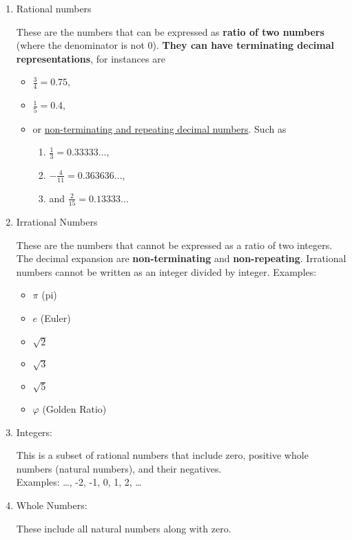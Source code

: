\documentclass{article}
\begin{document}
\begin{enumerate}

    \item Rational numbers \par 
    These are the numbers that can be expressed as
    \textbf{ratio of two numbers} (where the denominator is not 0).
    \textbf{They can have terminating decimal representations},
    for instances are
    \begin{itemize}
        \item $\frac{3}{4} = 0.75$,
        \item $\frac{1}{5} = 0.4$,
        \item or \underline{non-terminating and repeating decimal numbers}.
        Such as
        \begin{enumerate}
            \item $\frac{1}{3} = 0.33333\dots$,
            \item $- \frac{4}{11} = 0.363636\dots$,
            \item and $\frac{2}{15} = 0.13333\dots$
        \end{enumerate}
    \end{itemize}

    \item Irrational Numbers \par
    These are the numbers that cannot be expressed as a ratio of two integers.
    The decimal expansion are \textbf{non-terminating} and \textbf{non-repeating}.
    Irrational numbers cannot be written as an integer divided by integer.
    Examples:
    \begin{itemize}
        \item $\pi$ (pi)
        \item $e$ (Euler)
        \item $\sqrt{2}$
        \item $\sqrt{3}$
        \item $\sqrt{5}$
        \item $\varphi$ (Golden Ratio)
    \end{itemize}

    \item Integers: \par
    This is a subset of rational numbers that include zero,
    positive whole numbers (natural numbers), and their negatives. \\
    Examples: \dots, -2, -1, 0, 1, 2, \dots

    \item Whole Numbers: \par
    These include all natural numbers along with zero.


\end{enumerate}
\end{document}
